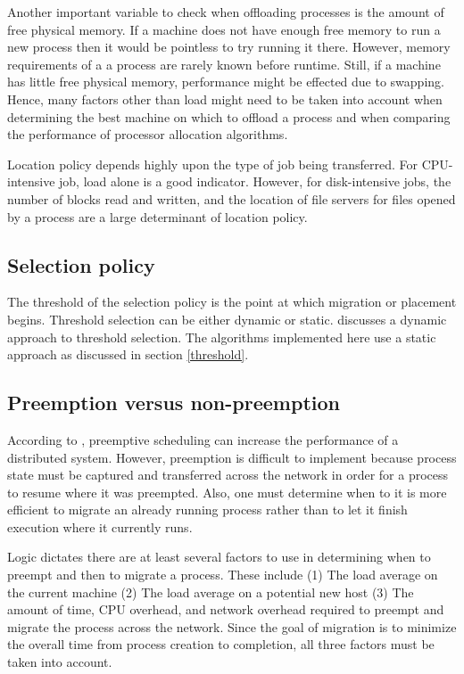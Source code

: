 \documentclass{report}
\begin{document}
Another important variable to check when offloading processes is the amount
of free physical memory.  If a machine does not have enough free memory to
run a new process then it would be pointless to try running it there.
However, memory requirements of a a process are rarely known before runtime.
Still, if a machine has little free physical memory, performance might be
effected due to swapping.  Hence, many factors other than load might need to
be taken into account when determining the best machine on which to offload
a process and when comparing the performance of processor allocation
algorithms.

Location policy depends highly upon the type of job being transferred.  For
CPU-intensive job, load alone is a good indicator.  However, for
disk-intensive jobs, the number of blocks read and written, and the location
of file servers for files opened by a process are a large determinant of
location policy.


\subsection{Selection policy}

The threshold of the selection policy is the point at which migration or
placement begins.  Threshold selection can be either dynamic or
static. \cite{gradient} discusses a dynamic approach to threshold
selection.  The algorithms implemented here use a static approach as
discussed in section \ref{threshold}.


\subsection{Preemption versus non-preemption}

According to \cite{preempt}, preemptive scheduling can increase the
performance of a distributed system.  However, preemption is difficult to
implement because process state must be captured and transferred across the
network in order for a process to resume where it was preempted.  Also, one
must determine when to it is more efficient to migrate an already running
process rather than to let it finish execution where it currently runs.

Logic dictates there are at least several factors to use in determining when
to preempt and then to migrate a process.  These include (1) The load
average on the current machine (2) The load average on a potential new host
(3) The amount of time, CPU overhead, and network overhead required to
preempt and migrate the process across the network.  Since the goal of
migration is to minimize the overall time from process creation to
completion, all three factors must be taken into account.
\end{document}
